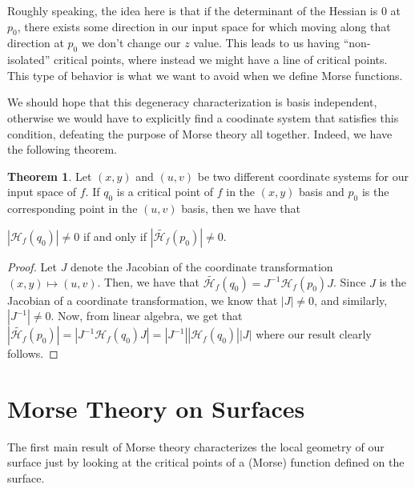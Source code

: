 \documentclass[12pt]{article}
\newcommand{\cH}{{\mathcal H}}
\theoremstyle{definition}
\newtheorem{theorem}{Theorem}
\begin{document}
\noindent
Roughly speaking, the idea here is that if the determinant of the Hessian is 0 at $p_0$, there exists some direction in our input space for which moving along that direction at $p_0$ we don't change our $z$ value. This leads to us having ``non-isolated'' critical points, where instead we might have a line of critical points. This type of behavior is what we want to avoid when we define Morse functions. 

\noindent
We should hope that this degeneracy characterization is basis independent, otherwise we would have to explicitly find a coodinate system that satisfies this condition, defeating the purpose of Morse theory all together. Indeed, we have the following theorem.

\begin{theorem}
	Let $(x,y)$ and $(u,v)$ be two different coordinate systems for our input space of $f$. If $q_0$ is a critical point of $f$ in the $(x,y)$ basis and $p_0$ is the corresponding point in the $(u,v)$ basis, then we have that 
	\begin{center}
		$|\cH_f(q_0)| \neq 0$ if and only if $|\tilde{\cH_f}(p_0)| \neq 0$. 
	\end{center}
\end{theorem}
\begin{proof}
	Let $J$ denote the Jacobian of the coordinate transformation $(x,y)\mapsto (u,v)$. Then, we have that $\tilde{\cH_f}(q_0) = J^{-1} \cH_f(p_0) J$. Since $J$ is the Jacobian of a coordinate transformation, we know that $|J|\neq 0$, and similarly, $|J^{-1}|\neq 0$. Now, from linear algebra, we get that $|\tilde{\cH_f}(p_0)| = |J^{-1}\cH_f(q_0)J|= |J^{-1}||\cH_f(q_0)||J|$ where our result clearly follows. 
\end{proof}
\pagebreak
\section{Morse Theory on Surfaces}
The first main result of Morse theory characterizes the local geometry of our surface just by looking at the critical points of a (Morse) function defined on the surface. 
\end{document}
